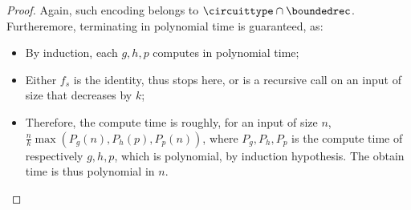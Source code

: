 \begin{proof}
  Again, such encoding belongs to $\circuittype \cap \boundedrec$.
  Furtheremore, terminating in polynomial time is guaranteed, as:
  \begin{itemize}
    \item By induction, each $g,h,p$ computes in polynomial time;
    \item Either $f_s$ is the identity, thus stops here, or is a recursive
      call on an input of size that decreases by $k$;
    \item Therefore, the compute time is roughly, for an input of size
      $n$, $\frac n k \max(P_g(n),P_h(p),P_p(n))$, where $P_g, P_h,P_p$ is the
      compute time of respectively $g,h,p$, which is polynomial, by
      induction hypothesis. The obtain time is thus polynomial in $n$. \qedhere
  \end{itemize}
\end{proof}

